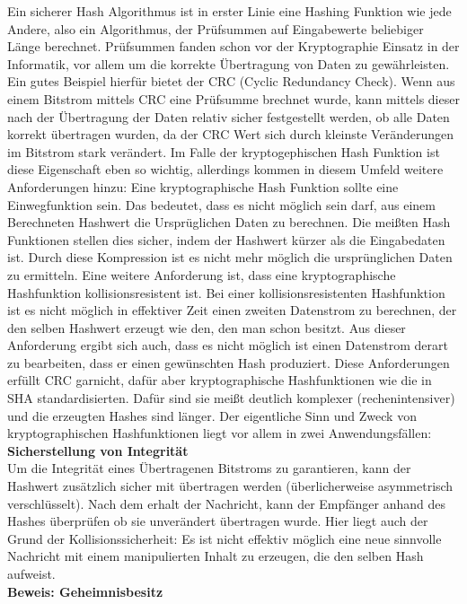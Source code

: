 \documentclass[12pt,a4paper,bibliography=totocnumbered,listof=totocnumbered]{scrartcl}
\begin{document}
Ein sicherer Hash Algorithmus ist in erster Linie eine Hashing Funktion wie jede Andere, also ein Algorithmus, der Prüfsummen auf Eingabewerte beliebiger Länge berechnet. Prüfsummen fanden schon vor der Kryptographie Einsatz in der Informatik, vor allem um die korrekte Übertragung von Daten zu gewährleisten. Ein gutes Beispiel hierfür bietet der CRC (Cyclic Redundancy Check). Wenn aus einem Bitstrom mittels CRC eine Prüfsumme brechnet wurde, kann mittels dieser nach der Übertragung der Daten relativ sicher festgestellt werden, ob alle Daten korrekt übertragen wurden, da der CRC Wert sich durch kleinste Veränderungen im Bitstrom stark verändert. Im Falle der kryptogephischen Hash Funktion ist diese Eigenschaft eben so wichtig, allerdings kommen  in diesem Umfeld weitere Anforderungen hinzu: Eine kryptographische Hash Funktion sollte eine Einwegfunktion sein. Das bedeutet, dass es nicht möglich sein darf, aus einem Berechneten Hashwert die Ursprüglichen Daten zu berechnen. Die meißten Hash Funktionen stellen dies sicher, indem der Hashwert kürzer als die Eingabedaten ist. Durch diese Kompression ist es nicht mehr möglich die ursprünglichen Daten zu ermitteln. Eine weitere Anforderung ist, dass eine kryptographische Hashfunktion kollisionsresistent ist. Bei einer kollisionsresistenten Hashfunktion ist es nicht möglich in effektiver Zeit einen zweiten Datenstrom zu berechnen, der den selben Hashwert erzeugt wie den, den man schon besitzt. Aus dieser Anforderung ergibt sich auch, dass es nicht möglich ist einen Datenstrom derart zu bearbeiten, dass er einen gewünschten Hash produziert. Diese Anforderungen erfüllt CRC garnicht, dafür aber kryptographische Hashfunktionen wie die in SHA standardisierten. Dafür sind sie meißt deutlich komplexer (rechenintensiver) und die erzeugten Hashes sind länger. Der eigentliche Sinn und Zweck von kryptographischen Hashfunktionen liegt vor allem in zwei Anwendungsfällen:
\\\textbf{Sicherstellung von Integrität}\\
Um die Integrität eines Übertragenen Bitstroms zu garantieren, kann der Hashwert zusätzlich sicher mit übertragen werden (überlicherweise asymmetrisch verschlüsselt). Nach dem erhalt der Nachricht, kann der Empfänger anhand des Hashes überprüfen ob sie unverändert übertragen wurde. Hier liegt auch der Grund der Kollisionssicherheit: Es ist nicht effektiv möglich eine neue sinnvolle Nachricht mit einem manipulierten Inhalt zu erzeugen, die den selben Hash aufweist.
\\\textbf{Beweis: Geheimnisbesitz}\\\label{KryptV}
\end{document}

